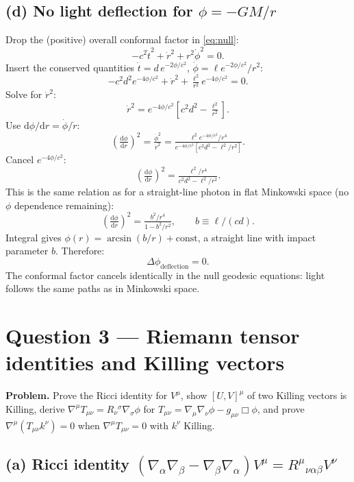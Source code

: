 \documentclass[11pt]{article}
\newcommand{\de}{\mathrm{d}}
\begin{document}
\subsection*{(d) No light deflection for $\phi=-GM/r$}

Drop the (positive) overall conformal factor in \eqref{eq:null}:
\[
-c^2\dot t^2 + \dot r^2 + r^2\dot\phi^2 = 0.
\]
Insert the conserved quantities $\dot t = d\,e^{-2\phi/c^2}$, $\dot\phi=\ell e^{-2\phi/c^2}/r^2$:
\[
-c^2 d^2 e^{-4\phi/c^2} + \dot r^2 + \tfrac{\ell^2}{r^2}e^{-4\phi/c^2} = 0.
\]
Solve for $\dot r^2$:
\[
\dot r^2 = e^{-4\phi/c^2}\!\left[c^2 d^2 - \tfrac{\ell^2}{r^2}\right].
\]
Use $\de\phi/\de r = \dot\phi/\dot r$:
\[
\!\left(\tfrac{\de\phi}{\de r}\right)^{\!2} = \tfrac{\dot\phi^2}{\dot r^2} = \tfrac{\ell^2 e^{-4\phi/c^2}/r^4}{e^{-4\phi/c^2}\!\left[c^2 d^2 - \ell^2/r^2\right]}.
\]
Cancel $e^{-4\phi/c^2}$:
\[
\!\left(\tfrac{\de\phi}{\de r}\right)^{\!2} = \tfrac{\ell^2/r^4}{c^2 d^2 - \ell^2/r^2}.
\]
This is the same relation as for a straight-line photon in flat Minkowski space (no $\phi$ dependence remaining):
\[
\!\left(\tfrac{\de\phi}{\de r}\right)^{\!2} = \tfrac{b^2/r^4}{1-b^2/r^2},\qquad b\equiv\ell/(cd).
\]
Integral gives $\phi(r) = \arcsin(b/r)+\text{const}$, a straight line with impact parameter $b$. Therefore:
\[
\boxed{\;\Delta\phi_{\mathrm{deflection}} = 0.\;}
\]
The conformal factor cancels identically in the null geodesic equations: light follows the same paths as in Minkowski space.

\section*{Question 3 --- Riemann tensor identities and Killing vectors}

\textbf{Problem.} Prove the Ricci identity for $V^\mu$, show $[U,V]^\mu$ of two Killing vectors is Killing, derive $\nabla^\mu T_{\mu\nu}=R_\nu{}^\sigma\nabla_\sigma\phi$ for $T_{\mu\nu}=\nabla_\mu\nabla_\nu\phi - g_{\mu\nu}\Box\phi$, and prove $\nabla^\mu(T_{\mu\nu}k^\nu)=0$ when $\nabla^\mu T_{\mu\nu}=0$ with $k^\nu$ Killing.

\subsection*{(a) Ricci identity $(\nabla_\alpha\nabla_\beta-\nabla_\beta\nabla_\alpha)V^\mu = R^\mu{}_{\nu\alpha\beta}V^\nu$}
\end{document}
